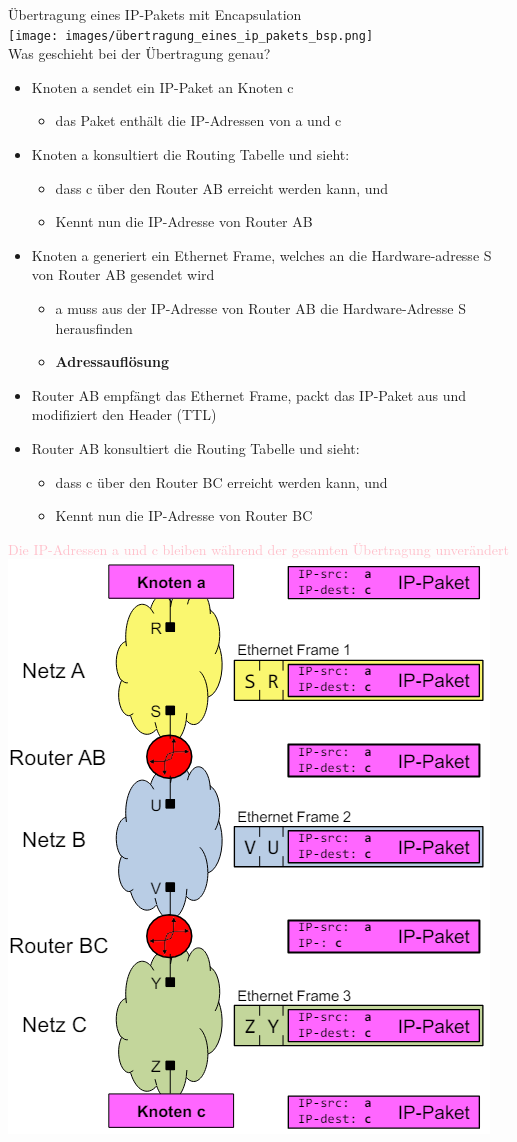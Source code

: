 \begin{example2}{Übertragung eines IP-Pakets mit Encapsulation}\\
    \texttt{[image: images/übertragung\_eines\_ip\_pakets\_bsp.png]}\\
    Was geschieht bei der Übertragung genau?
    \begin{itemize}
        \item Knoten a sendet ein IP-Paket an Knoten c
        \begin{itemize}
            \item das Paket enthält die IP-Adressen von a und c
        \end{itemize}
        \item Knoten a konsultiert die Routing Tabelle und sieht:
        \begin{itemize}
            \item dass c über den Router AB erreicht werden kann, und
            \item Kennt nun die IP-Adresse von Router AB
        \end{itemize}
        \item Knoten a generiert ein Ethernet Frame, welches an die Hardware-adresse S von Router AB gesendet wird
        \begin{itemize}
            \item a muss aus der IP-Adresse von Router AB die Hardware-Adresse S herausfinden
            \item \textbf{Adressauflösung}
        \end{itemize}
        \item Router AB empfängt das Ethernet Frame, packt das IP-Paket aus und modifiziert den Header (TTL)
        \item Router AB konsultiert die Routing Tabelle und sieht:
        \begin{itemize}
            \item dass c über den Router BC erreicht werden kann, und
            \item Kennt nun die IP-Adresse von Router BC
        \end{itemize}
    \end{itemize}
    \textcolor{pink}{Die IP-Adressen a und c bleiben während der gesamten Übertragung unverändert}\\
    \includegraphics[width=0.5\linewidth]{images/encapsulation_bsp.png}
\end{example2}

